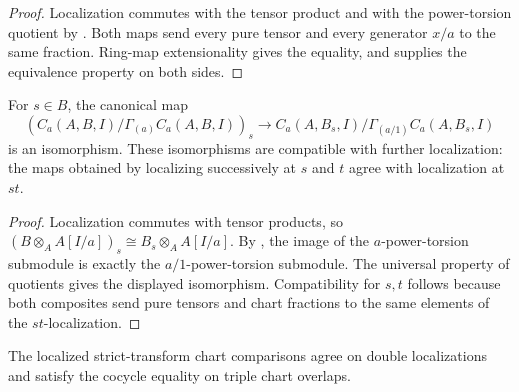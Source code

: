 \begin{proof}
  Localization commutes with the tensor product and with the power-torsion
  quotient by .  Both maps send
  every pure tensor and every generator $x/a$ to the same fraction.  Ring-map
  extensionality gives the equality, and
   supplies the equivalence
  property on both sides.
\end{proof}

\begin{lemma}
  \label{lemma:nagata-strict-transform-chart-localization-data}

  For $s\in B$, the canonical map
  \[
    (C_a(A,B,I)/\Gamma_{(a)}C_a(A,B,I))_s
      \longrightarrow
    C_a(A,B_s,I)/\Gamma_{(a/1)}C_a(A,B_s,I)
  \]
  is an isomorphism.  These isomorphisms are compatible with further
  localization: the maps obtained by localizing successively at $s$ and $t$
  agree with localization at $st$.
\end{lemma}

\begin{proof}
  Localization commutes with tensor products, so
  $(B\otimes_A A[I/a])_s\cong B_s\otimes_A A[I/a]$.  By
  , the image of the
  $a$-power-torsion submodule is exactly the $a/1$-power-torsion submodule.
  The universal property of quotients gives the displayed isomorphism.
  Compatibility for $s,t$ follows because both composites send pure tensors
  and chart fractions to the same elements of the $st$-localization.
\end{proof}

\begin{lemma}
  \label{lemma:nagata-strict-transform-chart-cocycle}

  The localized strict-transform chart comparisons agree on double
  localizations and satisfy the cocycle equality on triple chart overlaps.
\end{lemma}

